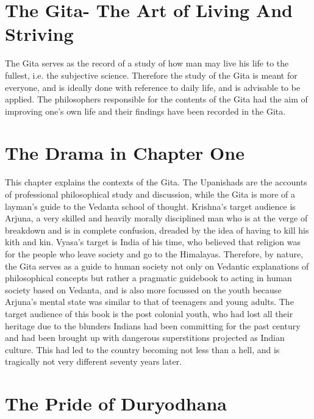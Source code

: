 \documentclass{article}
\begin{document}
\newpage \section{The Gita- The Art of Living And Striving}
The Gita serves as the record of a study of how man may live his life to the fullest, i.e. the subjective science. Therefore the study of the Gita is meant for everyone, and is ideally done with reference to daily life, and is advisable to be applied. The philosophers responsible for the contents of the Gita had the aim of improving one's own life and their findings have been recorded in the Gita.
\newpage \section{The Drama in Chapter One}
This chapter explains the contexts of the Gita. The Upanishads are the accounts of professional philosophical study and discussion, while the Gita is more of a layman's guide to the Vedanta school of thought. Krishna's target audience is Arjuna, a very skilled and heavily morally disciplined man who is at the verge of breakdown and is in complete confusion, dreaded by the idea of having to kill his kith and kin. Vyasa's target is India of his time, who believed that religion was for the people who leave society and go to the Himalayas. Therefore, by nature, the Gita serves as a guide to human society not only on Vedantic explanations of philosophical concepts but rather a pragmatic guidebook to acting in human society based on Vedanta, and is also more focussed on the youth because Arjuna's mental state was similar to that of teenagers and young adults. The target audience of this book is the post colonial youth, who had lost all their heritage due to the blunders Indians had been committing for the past century and had been brought up with dangerous superstitions projected as Indian culture. This had led to the country becoming not less than a hell, and is tragically not very different seventy years later.
\newpage \section{The Pride of Duryodhana}
\end{document}
